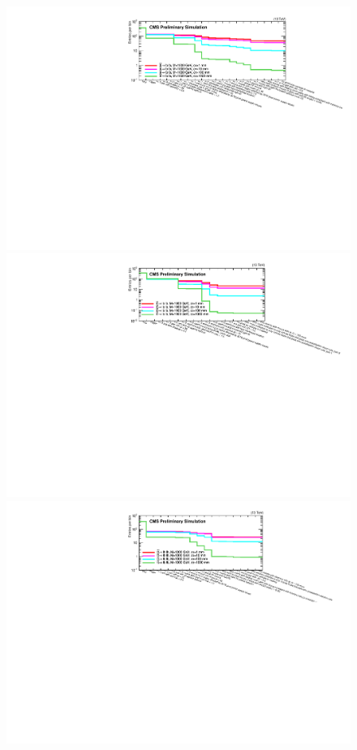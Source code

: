 \begin{figure}[hbtp]
\includegraphics[scale=0.65]{figures/selection/preselection/signal/cutFlow_2018EMuPreselection_1000GeV.pdf}
\includegraphics[scale=0.75]{figures/selection/preselection/signal/cutFlow_2018EEPreselection_1000GeV.pdf}
\includegraphics[scale=0.75]{figures/selection/preselection/signal/cutFlow_2018MuMuPreselection_1000GeV.pdf}

\end{figure}
